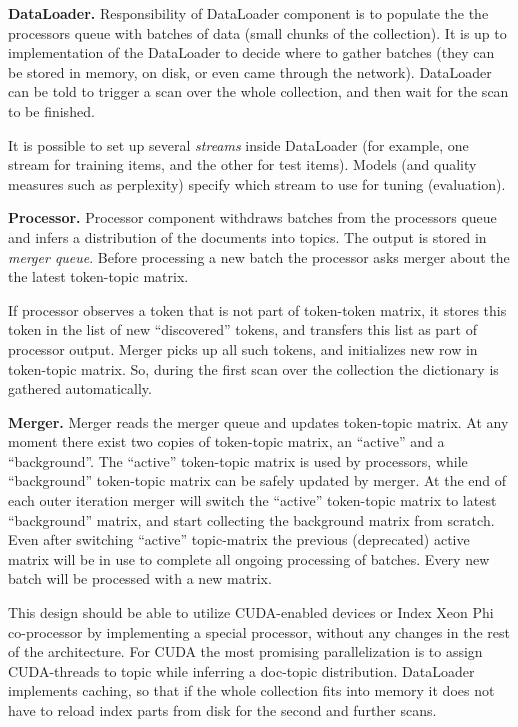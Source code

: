 \documentclass[11pt,a4paper,twoside]{report}
\begin{document}
\textbf{DataLoader.} Responsibility of DataLoader component is to populate the the processors queue
with batches of data (small chunks of the collection).
It is up to implementation of the DataLoader to decide where to gather batches
(they can be stored in memory, on disk, or even came through the network).
DataLoader can be told to trigger a scan over the whole collection,
and then wait for the scan to be finished.

It is possible to set up several \emph{streams} inside DataLoader
(for example, one stream for training items, and the other for test items).
Models (and quality measures such as perplexity) specify which stream to use for tuning (evaluation).

\textbf{Processor.} Processor component withdraws batches from the processors queue
and infers a distribution of the documents into topics.
The output is stored in \emph{merger queue}.
Before processing a new batch the processor asks merger about the the latest token-topic matrix.

If processor observes a token that is not part of token-token matrix, it stores this token in the list of
new ``discovered'' tokens, and transfers this list as part of processor output.
Merger picks up all such tokens, and initializes new row in token-topic matrix.
So, during the first scan over the collection the dictionary is gathered automatically.

\textbf{Merger.}
Merger reads the merger queue and updates token-topic matrix.
At any moment there exist two copies of token-topic matrix,
an ``active'' and a ``background''.
The ``active'' token-topic matrix is used by processors,
while ``background'' token-topic matrix can be safely updated by merger.
At the end of each outer iteration merger will switch the ``active''
token-topic matrix to latest ``background'' matrix,
and start collecting the background matrix from scratch.
Even after switching ``active'' topic-matrix the previous (deprecated) active matrix
will be in use to complete all ongoing processing of batches.
Every new batch will be processed with a new matrix.

This design should be able to utilize CUDA-enabled devices or Index Xeon Phi co-processor
by implementing a special processor, without any changes in the rest of the architecture.
For CUDA the most promising parallelization is to assign CUDA-threads to topic
while inferring a doc-topic distribution.
DataLoader implements caching, so that if the whole collection fits into memory
it does not have to reload index parts from disk for the second and further scans.
\end{document}
